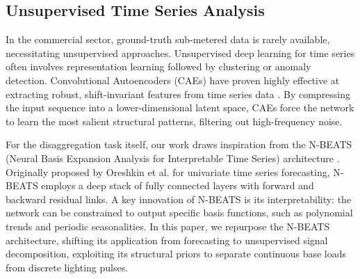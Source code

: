 \subsection{Unsupervised Time Series Analysis}
In the commercial sector, ground-truth sub-metered data is rarely available, necessitating unsupervised approaches. Unsupervised deep learning for time series often involves representation learning followed by clustering or anomaly detection. Convolutional Autoencoders (CAEs) have proven highly effective at extracting robust, shift-invariant features from time series data \cite{cae_2021}. By compressing the input sequence into a lower-dimensional latent space, CAEs force the network to learn the most salient structural patterns, filtering out high-frequency noise.

For the disaggregation task itself, our work draws inspiration from the N-BEATS (Neural Basis Expansion Analysis for Interpretable Time Series) architecture \cite{nbeats_2020}. Originally proposed by Oreshkin et al. for univariate time series forecasting, N-BEATS employs a deep stack of fully connected layers with forward and backward residual links. A key innovation of N-BEATS is its interpretability: the network can be constrained to output specific basis functions, such as polynomial trends and periodic seasonalities. In this paper, we repurpose the N-BEATS architecture, shifting its application from forecasting to unsupervised signal decomposition, exploiting its structural priors to separate continuous base loads from discrete lighting pulses.
